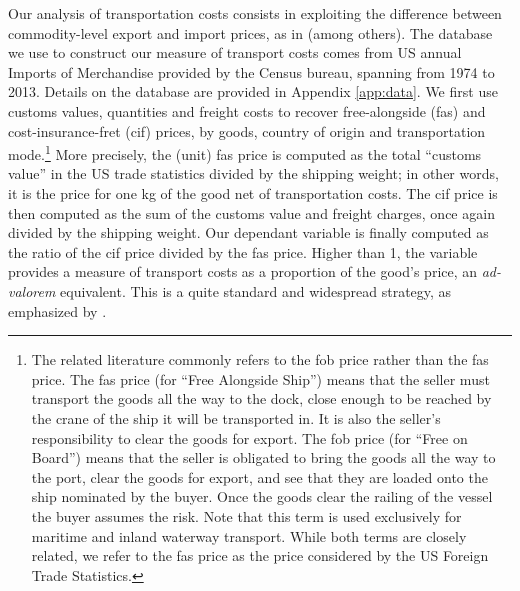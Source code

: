 \documentclass[a4paper,11pt]{article}
\begin{document}
Our analysis of transportation costs consists in exploiting the difference between commodity-level export and import prices, as in \cite{hummels2007} (among others). The database we use to construct our measure of transport costs comes from US annual Imports of Merchandise provided by the Census bureau, spanning from 1974 to 2013. Details on the database are provided in Appendix \ref{app:data}. We first use customs values, quantities and freight costs to recover free-alongside (fas) and cost-insurance-fret (cif) prices, by goods, country of origin and transportation mode.\footnote{The related literature commonly refers to the fob price rather than the fas price. The fas price (for ``Free Alongside Ship'') means that the seller must transport the goods all the way to the dock, close enough to be reached by the crane of the ship it will be transported in. It is also the seller's responsibility to clear the goods for export. The fob price (for ``Free on Board'') means that the seller is obligated to bring the goods all the way to the port, clear the goods for export, and see that they are loaded onto the ship nominated by the buyer. Once the goods clear the railing of the vessel the buyer assumes the risk. Note that this term is used exclusively for maritime and inland waterway transport. While both terms are closely related, we refer to the fas price as the price considered by the US Foreign Trade Statistics.} More precisely, the (unit) fas price is computed as the total ``customs value'' in the US trade statistics divided by the shipping weight; in other words, it is the price for one kg of the good net of transportation costs. The cif price is then computed as the sum of the customs value and freight charges, once again divided by the shipping weight. Our dependant variable is finally computed as the ratio of the cif price divided by the fas price. Higher than 1, the variable provides a measure of transport costs as a proportion of the good's price, an \emph{ad-valorem} equivalent. This is a quite standard and widespread strategy, as emphasized by \citet{anderson_wincoop_jel}.
\end{document}
